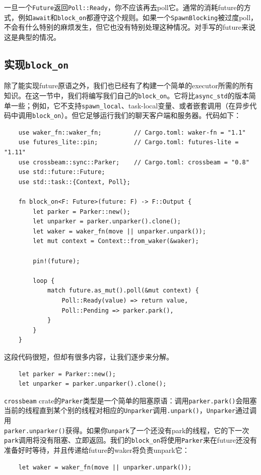 一旦一个\texttt{Future}返回\texttt{Poll::Ready}，你不应该再去poll它。通常的消耗future的方式，例如\texttt{await}和\texttt{block\_on}都遵守这个规则。如果一个\texttt{SpawnBlocking}被过度poll，不会有什么特别的麻烦发生，但它也没有特别处理这种情况。对手写的future来说这是典型的情况。

\subsection{实现\texttt{block\_on}}
除了能实现future原语之外，我们也已经有了构建一个简单的executor所需的所有知识。在这一节中，我们将编写我们自己的\texttt{block\_on}。它将比\texttt{async\_std}的版本简单一些；例如，它不支持\texttt{spawn\_local}、task-local变量、或者嵌套调用（在异步代码中调用\texttt{block\_on}）。但它足够运行我们的聊天客户端和服务器。代码如下：
\begin{verbatim}
    use waker_fn::waker_fn;         // Cargo.toml: waker-fn = "1.1"
    use futures_lite::pin;          // Cargo.toml: futures-lite = "1.11"
    use crossbeam::sync::Parker;    // Cargo.toml: crossbeam = "0.8"
    use std::future::Future;
    use std::task::{Context, Poll};

    fn block_on<F: Future>(future: F) -> F::Output {
        let parker = Parker::new();
        let unparker = parker.unparker().clone();
        let waker = waker_fn(move || unparker.unpark());
        let mut context = Context::from_waker(&waker);

        pin!(future);

        loop {
            match future.as_mut().poll(&mut context) {
                Poll::Ready(value) => return value,
                Poll::Pending => parker.park(),
            }
        }
    }
\end{verbatim}

这段代码很短，但却有很多内容，让我们逐步来分解。

\begin{verbatim}
    let parker = Parker::new();
    let unparker = parker.unparker().clone();
\end{verbatim}

\texttt{crossbeam} crate的\texttt{Parker}类型是一个简单的阻塞原语：调用\texttt{parker.park()}会阻塞当前的线程直到某个别的线程对相应的\texttt{Unparker}调用\texttt{.unpark()}，\texttt{Unparker}通过调用\\
\texttt{parker.unparker()}获得。如果你\texttt{unpark}了一个还没有park的线程，它的下一次\texttt{park}调用将没有阻塞、立即返回。我们的\texttt{block\_on}将使用\texttt{Parker}来在future还没有准备好时等待，并且传递给future的waker将负责unpark它：
\begin{verbatim}
    let waker = waker_fn(move || unparker.unpark());
\end{verbatim}

